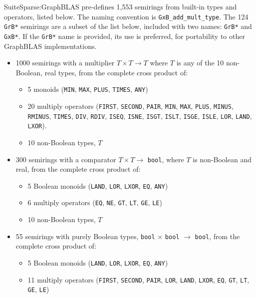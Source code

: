 \documentclass[12pt]{article}
\begin{document}
SuiteSparse:GraphBLAS pre-defines 1,553 semirings from built-in types and
operators, listed below.  The naming convention is \verb'GxB_add_mult_type'.
The 124 \verb'GrB*' semirings are a subset of the list below, included with two
names: \verb'GrB*' and \verb'GxB*'.  If the \verb'GrB*' name is provided, its
use is preferred, for portability to other GraphBLAS implementations.

\vspace{-0.05in}
\begin{itemize}
\item 1000 semirings with a multiplier $T \times T \rightarrow T$ where $T$ is
    any of the 10 non-Boolean, real types, from the complete cross product of:

    \vspace{-0.05in}
    \begin{itemize}
    \item 5 monoids (\verb'MIN', \verb'MAX', \verb'PLUS', \verb'TIMES', \verb'ANY')
    \item 20 multiply operators
    (\verb'FIRST', \verb'SECOND', \verb'PAIR', \verb'MIN', \verb'MAX',
    \verb'PLUS', \verb'MINUS', \verb'RMINUS', \verb'TIMES', \verb'DIV', \verb'RDIV',
    \verb'ISEQ', \verb'ISNE', \verb'ISGT',
    \verb'ISLT', \verb'ISGE', \verb'ISLE',
    \verb'LOR', \verb'LAND', \verb'LXOR').
    \item 10 non-Boolean types, $T$
    \end{itemize}

\item 300 semirings with a comparator $T \times T \rightarrow$
    \verb'bool', where $T$ is non-Boolean and real, from the complete cross product of:

    \vspace{-0.05in}
    \begin{itemize}
    \item 5 Boolean monoids
    (\verb'LAND', \verb'LOR', \verb'LXOR', \verb'EQ', \verb'ANY')
    \item 6 multiply operators
    (\verb'EQ', \verb'NE', \verb'GT', \verb'LT', \verb'GE', \verb'LE')
    \item 10 non-Boolean types, $T$
    \end{itemize}

\item 55 semirings with purely Boolean types, \verb'bool' $\times$ \verb'bool'
    $\rightarrow$ \verb'bool', from the complete cross product of:

    \vspace{-0.05in}
    \begin{itemize}
    \item 5 Boolean monoids
    (\verb'LAND', \verb'LOR', \verb'LXOR', \verb'EQ', \verb'ANY')
    \item 11 multiply operators
    (\verb'FIRST', \verb'SECOND', \verb'PAIR', \verb'LOR', \verb'LAND', \verb'LXOR',
    \verb'EQ', \verb'GT', \verb'LT', \verb'GE', \verb'LE')
    \end{itemize}


\end{itemize}
\end{document}
